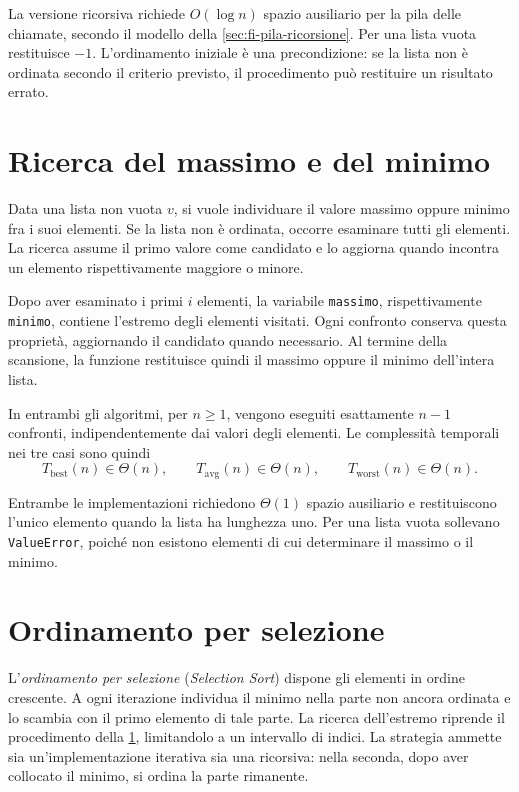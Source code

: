 La versione ricorsiva richiede \(O(\log n)\) spazio ausiliario
per la pila delle chiamate, secondo il modello della
\cref{sec:fi-pila-ricorsione}. Per una lista vuota restituisce
\(-1\). L'ordinamento iniziale è una precondizione: se la lista
non è ordinata secondo il criterio previsto, il procedimento
può restituire un risultato errato.

\section{Ricerca del massimo e del minimo}
\label{sec:fi-ricerca-estremi}

Data una lista non vuota \(v\), si vuole individuare il valore
massimo oppure minimo fra i suoi elementi. Se la lista non è
ordinata, occorre esaminare tutti gli elementi. La ricerca assume
il primo valore come candidato e lo aggiorna quando incontra un
elemento rispettivamente maggiore o minore.



Dopo aver esaminato i primi \(i\) elementi, la variabile
\texttt{massimo}, rispettivamente \texttt{minimo}, contiene
l'estremo degli elementi visitati. Ogni confronto conserva
questa proprietà, aggiornando il candidato quando necessario.
Al termine della scansione, la funzione restituisce quindi
il massimo oppure il minimo dell'intera lista.

In entrambi gli algoritmi, per \(n\ge1\), vengono eseguiti
esattamente \(n-1\) confronti, indipendentemente dai valori
degli elementi. Le complessità temporali nei tre casi sono quindi
\[
  T_{\mathrm{best}}(n)\in\Theta(n),\qquad
  T_{\mathrm{avg}}(n)\in\Theta(n),\qquad
  T_{\mathrm{worst}}(n)\in\Theta(n).
\]

Entrambe le implementazioni richiedono \(\Theta(1)\) spazio
ausiliario e restituiscono l'unico elemento quando la lista
ha lunghezza uno. Per una lista vuota sollevano
\texttt{ValueError}, poiché non esistono elementi di cui
determinare il massimo o il minimo.

\section{Ordinamento per selezione}
\label{sec:fi-ordinamento-selezione}

L'\emph{ordinamento per selezione} (\emph{Selection Sort}) dispone
gli elementi in ordine crescente. A ogni iterazione individua il
minimo nella parte non ancora ordinata e lo scambia con il primo
elemento di tale parte. La ricerca dell'estremo riprende il
procedimento della \cref{sec:fi-ricerca-estremi}, limitandolo a un
intervallo di indici. La strategia ammette sia un'implementazione
iterativa sia una ricorsiva: nella seconda, dopo aver collocato
il minimo, si ordina la parte rimanente.

